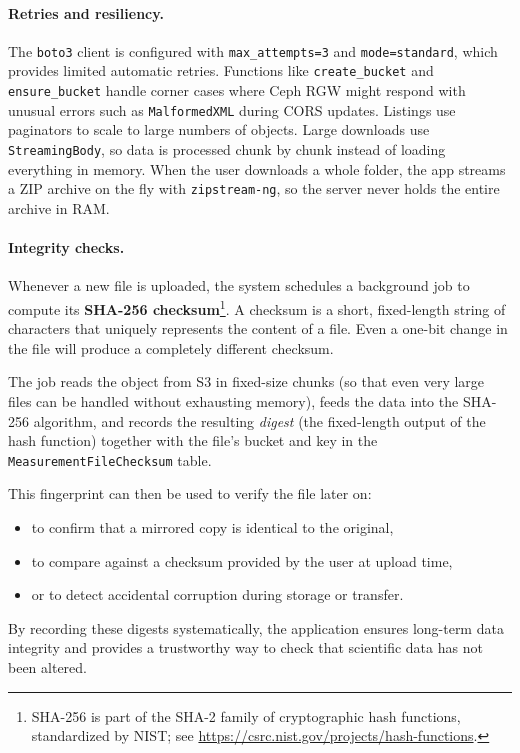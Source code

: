 \paragraph{Retries and resiliency.}
The \texttt{boto3} client is configured with \texttt{max\_attempts=3} and \texttt{mode=standard}, 
which provides limited automatic retries.  
Functions like \texttt{create\_bucket} and \texttt{ensure\_bucket} handle corner cases where Ceph RGW 
might respond with unusual errors such as \texttt{MalformedXML} during CORS updates.  
Listings use paginators to scale to large numbers of objects.  
Large downloads use \texttt{StreamingBody}, so data is processed chunk by chunk instead of loading everything in memory.  
When the user downloads a whole folder, the app streams a ZIP archive on the fly with \texttt{zipstream-ng}, 
so the server never holds the entire archive in RAM.

\paragraph{Integrity checks.}
Whenever a new file is uploaded, the system schedules a background job to compute its 
\textbf{SHA-256 checksum}\footnote{SHA-256 is part of the SHA-2 family of cryptographic hash functions, standardized by NIST; see \url{https://csrc.nist.gov/projects/hash-functions}.}.  
A checksum is a short, fixed-length string of characters that uniquely represents the content of a file.  
Even a one-bit change in the file will produce a completely different checksum.  

The job reads the object from S3 in fixed-size chunks (so that even very large files can be handled without exhausting memory), 
feeds the data into the SHA-256 algorithm, and records the resulting \emph{digest} (the fixed-length output of the hash function) together with the file’s bucket and key 
in the \texttt{MeasurementFileChecksum} table.  

This fingerprint can then be used to verify the file later on:
\begin{itemize}
	\item to confirm that a mirrored copy is identical to the original,  
	\item to compare against a checksum provided by the user at upload time,  
	\item or to detect accidental corruption during storage or transfer.  
\end{itemize}

By recording these digests systematically, the application ensures long-term data integrity and 
provides a trustworthy way to check that scientific data has not been altered.

